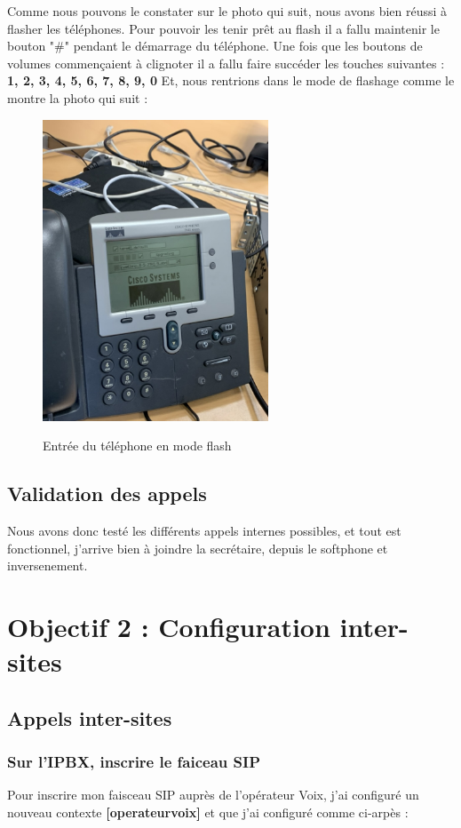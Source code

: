 \documentclass[12pt, a4paper]{article}
\begin{document}
	Comme nous pouvons le constater sur le photo qui suit, nous avons bien
	réussi à flasher les téléphones. Pour pouvoir les tenir prêt au flash
	il a fallu maintenir le bouton "\#" pendant le démarrage du téléphone. 
	Une fois que les boutons de volumes commençaient à clignoter il a fallu
	faire succéder les touches suivantes : \textbf{1, 2, 3, 4, 5, 6, 7, 8, 9, 0}
	Et, nous rentrions dans le mode de flashage comme le montre la photo qui suit : 
	\begin{figure}[h]
		\centering
		{\includegraphics[width=0.6\textwidth]{img/F316F6A2-F9B9-4515-9004-3596AD28EBC8_1_105_c.jpeg}}
		\caption{Entrée du téléphone en mode flash}
		\label{fig:flash}
	\end{figure}

\subsection{Validation des appels}
Nous avons donc testé les différents appels internes possibles, et tout 
est fonctionnel, j'arrive bien à joindre la secrétaire, depuis le 
softphone et inversenement. 

\newpage
\section{Objectif 2 : Configuration inter-sites}
	\subsection{Appels inter-sites}
	\subsubsection{Sur l'IPBX, inscrire le faiceau SIP}
	Pour inscrire mon faisceau SIP auprès de l'opérateur Voix, j'ai 
	configuré un nouveau contexte \textbf{[operateurvoix]} et que j'ai configuré
	comme ci-arpès : 
\end{document}
